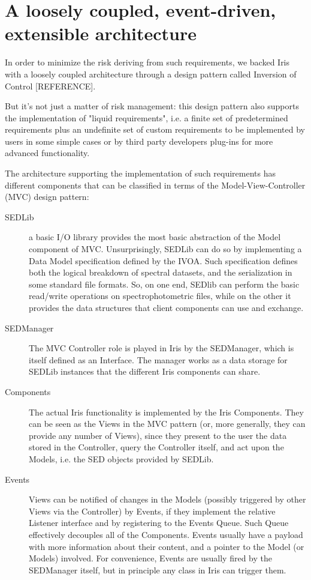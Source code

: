 \section{A loosely coupled, event-driven, extensible architecture}
\label{sec:architecture}

In order to minimize the risk deriving from such requirements, we backed Iris with a loosely coupled architecture through a design pattern called Inversion of Control [REFERENCE].

But it's not just a matter of risk management: this design pattern also supports the implementation of "liquid requirements", i.e. a finite set of predetermined requirements plus an undefinite set of custom requirements to be implemented by users in some simple cases or by third party developers plug-ins for more advanced functionality.

The architecture supporting the implementation of such requirements has different components that can be classified in terms of the Model-View-Controller (MVC) design pattern:
\begin{description}
\item[SEDLib] a basic I/O library provides the most basic abstraction of the Model component of MVC. Unsurprisingly, SEDLib can do so by implementing a Data Model specification defined by the IVOA. Such specification defines both the logical breakdown of spectral datasets, and the serialization in some standard file formats. So, on one end, SEDlib can perform the basic read/write operations on spectrophotometric files, while on the other it provides the data structures that client components can use and exchange.
\item[SEDManager] The MVC Controller role is played in Iris by the SEDManager, which is itself defined as an Interface. The manager works as a data storage for SEDLib instances that the different Iris components can share.
\item[Components] The actual Iris functionality is implemented by the Iris Components. They can be seen as the Views in the MVC pattern (or, more generally, they can provide any number of Views), since they present to the user the data stored in the Controller, query the Controller itself, and act upon the Models, i.e. the SED objects provided by SEDLib.
\item[Events] Views can be notified of changes in the Models (possibly triggered by other Views via the Controller) by Events, if they implement the relative Listener interface and by registering to the Events Queue. Such Queue effectively decouples all of the Components. Events usually have a payload with more information about their content, and a pointer to the Model (or Models) involved. For convenience, Events are usually fired by the SEDManager itself, but in principle any class in Iris can trigger them.
\end{description}

